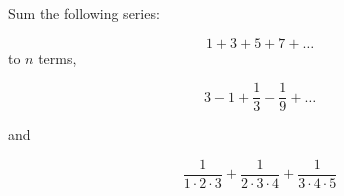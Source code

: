 Sum the following series:

\[
1 + 3 + 5 + 7 + \dots
\] 
to $n$ terms,

\[
3 - 1 + \dfrac{1}{3} - \dfrac{1}{9} + \dots
\]

and 

\[
\dfrac{1}{1 \cdot 2 \cdot 3} 
+ \dfrac{1}{2 \cdot 3 \cdot 4}
+ \dfrac{1}{3 \cdot 4 \cdot 5}
\]
